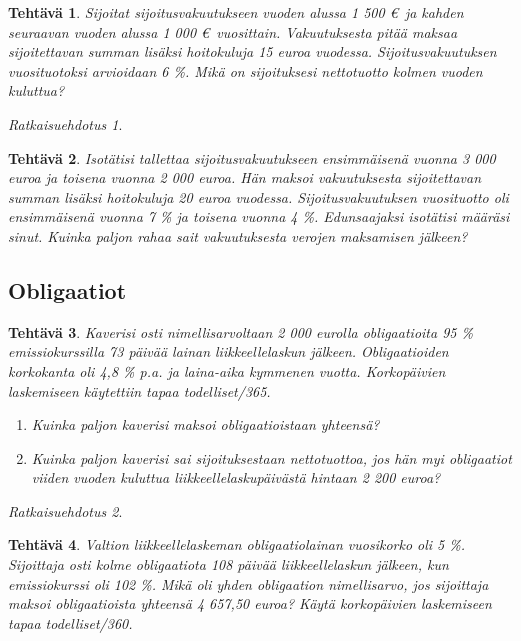 \documentclass{article}\usepackage[]{graphicx}\usepackage[]{color}
\newtheorem{teht}{Tehtävä}
\theoremstyle{remark}
\newtheorem*{ratk}{Ratkaisuehdotus}
\begin{document}
\begin{teht} Sijoitat sijoitusvakuutukseen vuoden alussa 1 500 \euro \ ja kahden seuraavan vuoden alussa 1 000 \euro \ vuosittain. Vakuutuksesta pitää maksaa sijoitettavan summan lisäksi hoitokuluja 15 euroa vuodessa. Sijoitusvakuutuksen vuosituotoksi arvioidaan 6 \%. Mikä on sijoituksesi nettotuotto kolmen vuoden kuluttua? 

\end{teht}\begin{ratk}\end{ratk}

\begin{teht} Isotätisi tallettaa sijoitusvakuutukseen ensimmäisenä vuonna 3 000 euroa ja toisena vuonna 2 000 euroa. Hän maksoi vakuutuksesta sijoitettavan summan lisäksi hoitokuluja 20 euroa vuodessa. Sijoitusvakuutuksen vuosituotto oli ensimmäisenä vuonna 7 \% ja toisena vuonna 4 \%. Edunsaajaksi isotätisi määräsi sinut. Kuinka paljon rahaa sait vakuutuksesta verojen maksamisen jälkeen?
\end{teht}

\subsection*{Obligaatiot}

\begin{teht} Kaverisi osti nimellisarvoltaan 2 000 eurolla obligaatioita 95 \% emissiokurssilla 73 päivää lainan liikkeellelaskun jälkeen. Obligaatioiden korkokanta oli 4{,}8 \% p.a. ja laina-aika kymmenen vuotta. Korkopäivien laskemiseen käytettiin tapaa todelliset/365.
\begin{enumerate}
  \item Kuinka paljon kaverisi maksoi obligaatioistaan yhteensä?
  \item Kuinka paljon kaverisi sai sijoituksestaan nettotuottoa, jos hän myi obligaatiot viiden vuoden kuluttua liikkeellelaskupäivästä hintaan 2 200 euroa?
\end{enumerate}

\end{teht}\begin{ratk}\end{ratk}

\begin{teht} Valtion liikkeellelaskeman obligaatiolainan vuosikorko oli 5 \%. Sijoittaja osti kolme obligaatiota 108 päivää liikkeellelaskun jälkeen, kun emissiokurssi oli 102 \%. Mikä oli yhden obligaation nimellisarvo, jos sijoittaja maksoi obligaatioista yhteensä 4 657{,}50 euroa? Käytä korkopäivien laskemiseen tapaa todelliset/360.
\end{teht}
\end{document}
